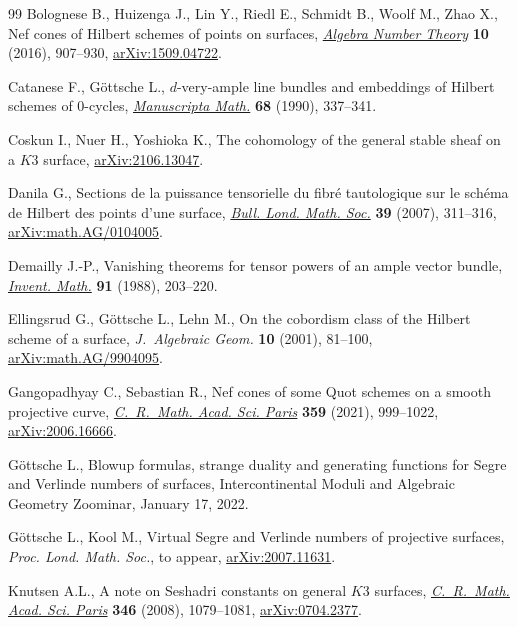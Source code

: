 \begin{thebibliography}{99}
Bolognese B., Huizenga J., Lin Y., Riedl E., Schmidt B., Woolf M., Zhao X., Nef
 cones of {H}ilbert schemes of points on surfaces, \href{https://doi.org/10.2140/ant.2016.10.907}{\textit{Algebra Number
 Theory}} \textbf{10} (2016), 907--930, \href{https://arxiv.org/abs/1509.04722}{arXiv:1509.04722}.

Catanese F., G\"ottsche L., {$d$}-very-ample line bundles and embeddings of
 {H}ilbert schemes of {$0$}-cycles, \href{https://doi.org/10.1007/BF02568768}{\textit{Manuscripta Math.}} \textbf{68}
 (1990), 337--341.

Coskun I., Nuer H., Yoshioka K., The cohomology of the general stable sheaf on
 a $K3$ surface, \href{https://arxiv.org/abs/2106.13047}{arXiv:2106.13047}.

Danila G., Sections de la puissance tensorielle du fibr\'e tautologique sur le
 sch\'ema de {H}ilbert des points d'une surface, \href{https://doi.org/10.1112/blms/bdl035}{\textit{Bull. Lond. Math.
 Soc.}} \textbf{39} (2007), 311--316, \href{https://arxiv.org/abs/math.AG/0104005}{arXiv:math.AG/0104005}.

Demailly J.-P., Vanishing theorems for tensor powers of an ample vector bundle,
 \href{https://doi.org/10.1007/BF01404918}{\textit{Invent. Math.}} \textbf{91} (1988), 203--220.

Ellingsrud G., G\"ottsche L., Lehn M., On the cobordism class of the {H}ilbert
 scheme of a surface, \textit{J.~Algebraic Geom.} \textbf{10} (2001), 81--100,
 \href{https://arxiv.org/abs/math.AG/9904095}{arXiv:math.AG/9904095}.

Gangopadhyay C., Sebastian R., Nef cones of some {Q}uot schemes on a smooth
 projective curve, \href{https://doi.org/10.5802/crmath.245}{\textit{C.~R.~Math. Acad. Sci. Paris}} \textbf{359} (2021),
 999--1022, \href{https://arxiv.org/abs/2006.16666}{arXiv:2006.16666}.

G\"ottsche L., Blowup formulas, strange duality and generating functions for
 Segre and Verlinde numbers of surfaces, {I}ntercontinental Moduli and
 Algebraic Geometry Zoominar, January 17, 2022.

G\"ottsche L., Kool M., Virtual Segre and Verlinde numbers of projective
 surfaces, \textit{Proc. Lond. Math. Soc.}, {t}o appear, \href{https://arxiv.org/abs/2007.11631}{arXiv:2007.11631}.

Knutsen A.L., A note on {S}eshadri constants on general {$K3$} surfaces,
 \href{https://doi.org/10.1016/j.crma.2008.09.008}{\textit{C.~R.~Math. Acad. Sci. Paris}} \textbf{346} (2008), 1079--1081,
 \href{https://arxiv.org/abs/0704.2377}{arXiv:0704.2377}.


\end{thebibliography}
